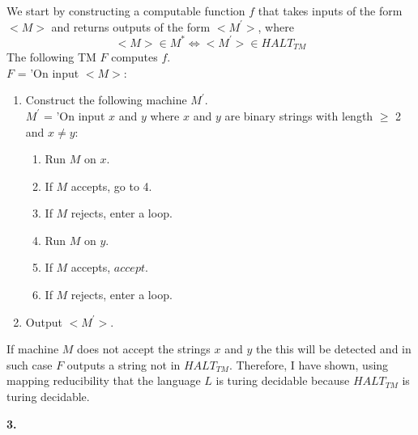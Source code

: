 \documentclass[a4paper,12pt]{article}
\begin{document}
\begin{enumerate}[label=\alph*)]
We start by constructing a computable function $f$ that takes inputs of the form $<M>$ and returns outputs of the form $<M^{'}>$, where 
$$<M> \in M^{*} \iff <M^{'}> \in HALT_{TM}$$
The following TM $F$ computes $f$. \\
$F$ = 'On input $<M>$:
\begin{enumerate}[label=\arabic*)]
\item Construct the following machine $M^{'}$. \\
$M^{'}$ = 'On input $x$ and $y$ where $x$ and $y$ are binary strings with length $\geq$ 2 and $x \neq y$: 
\begin{enumerate}[label=\arabic*)]
\item Run $M$ on $x$.
\item If $M$ accepts, go to 4.
\item If $M$ rejects, enter a loop.
\item Run $M$ on $y$.
\item If $M$ accepts, $accept$.
\item If $M$ rejects, enter a loop.
\end{enumerate}
\item Output $<M^{'}>$.
\end{enumerate}
If machine $M$ does not accept the strings $x$ and $y$ the this will be detected and in such case $F$ outputs a string not in $HALT_{TM}$. Therefore, I have shown, using mapping reducibility that the language $L$ is turing decidable because $HALT_{TM}$ is turing decidable. 
\end{enumerate}
\newpage
\noindent \textbf{3.}
\end{document}
